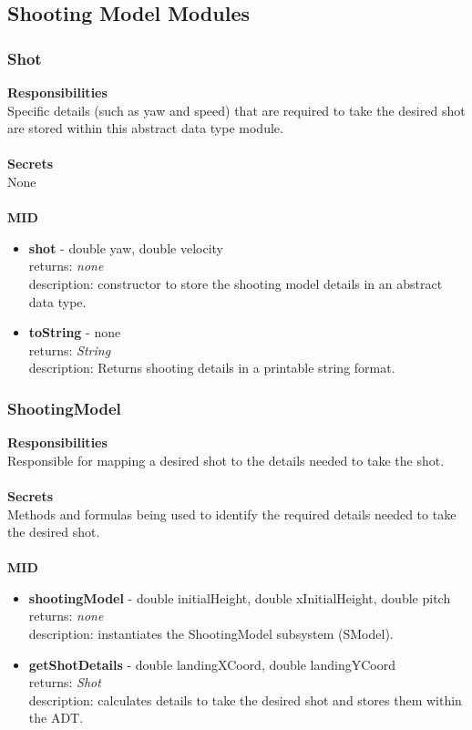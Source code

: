 \documentclass[11pt]{article}
\begin{document}
\subsection{Shooting Model Modules}
\subsubsection*{Shot}
\textbf{Responsibilities} \\
Specific details (such as yaw and speed) that are required to take the desired shot are stored within this abstract data type module. \\ \\
\textbf{Secrets} \\ 
None \\  \\
\textbf{MID} 
\begin{itemize}
\item \textbf{shot} - double yaw, double velocity \\ returns: \textit{none} \\ description: constructor to store the shooting model details in an abstract data type.
\item \textbf{toString} - none \\ returns: \textit{String} \\ description: Returns shooting details in a printable string format.
\end{itemize}

\subsubsection*{ShootingModel}
\textbf{Responsibilities} \\
Responsible for mapping a desired shot to the details needed to take the shot. \\ \\
\textbf{Secrets} \\ 
Methods and formulas being used to identify the required details needed to take the desired shot. \\  \\
\textbf{MID} 
\begin{itemize}
\item \textbf{shootingModel} - double  initialHeight, double xInitialHeight, double pitch \\ returns: \textit{none} \\ description: instantiates the ShootingModel subsystem (SModel).
\item \textbf{getShotDetails} - double landingXCoord, double landingYCoord \\ returns: \textit{Shot} \\ description: calculates details to take the desired shot and stores them within the ADT.
\end{itemize}
\end{document}
